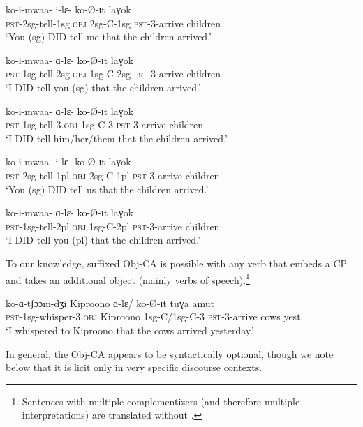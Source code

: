 \documentclass[output=paper
,newtxmath
,modfonts
,nonflat]{langsci/langscibook}
\begin{document}
\ea \label{Obj CA Examples} 
\begin{xlist}

\ex \gll ko-i-mwaa- i-lɛ- ko-\O-ɪt laɣok \\
\textsc{pst}-2sg-tell-1sg.\textsc{obj} 2sg-C-1sg \textsc{pst}-3-arrive children \\ 
\glt `You (sg) DID tell me that the children arrived.'

\ex \gll ko-i-mwaa- ɑ-lɛ- ko-\O-ɪt laɣok \\
\textsc{pst}-1sg-tell-2sg.\textsc{obj} 1sg-C-2sg \textsc{pst}-3-arrive children \\
\glt `I DID tell you (sg) that the children arrived.'

\ex \gll ko-i-mwaa- ɑ-lɛ- ko-\O-ɪt laɣok \\
\textsc{pst}-1sg-tell-3.\textsc{obj} 1sg-C-3 \textsc{pst}-3-arrive children \\
\glt `I DID tell him/her/them that the children arrived.'

\ex \gll ko-i-mwaa- i-lɛ- ko-\O-ɪt laɣok \\
\textsc{pst}-2sg-tell-1pl.\textsc{obj} 2sg-C-1pl \textsc{pst}-3-arrive children \\
\glt `You (sg) DID tell us that the children arrived.'

\ex \gll ko-i-mwaa- ɑ-lɛ- ko-\O-ɪt laɣok \\
\textsc{pst}-1sg-tell-2pl.\textsc{obj} 1sg-C-2pl \textsc{pst}-3-arrive children \\
\glt `I DID tell you (pl) that the children arrived.'

\end{xlist}
\z

\noindent To our knowledge, suffixed Obj-CA is possible with any verb that embeds a CP and takes an additional object (mainly verbs of speech).\footnote{Sentences with multiple complementizers (and therefore multiple interpretations) are translated without .} 

\ea 
\gll ko-ɑ-tʃɔɔm-dʒi Kiproono ɑ-lɛ/ ko-\O-ɪt tuɣa amut \\
\textsc{pst}-1sg-whisper-3.\textsc{obj} Kiproono 1sg-C/1sg-C-3 \textsc{pst}-3-arrive cows yest. \\
\glt `I whispered to Kiproono that the cows arrived yesterday.' 
\z

\noindent In general, the Obj-CA appears to be syntactically optional, though we note below that it is licit only in very specific discourse contexts.  
\end{document}

